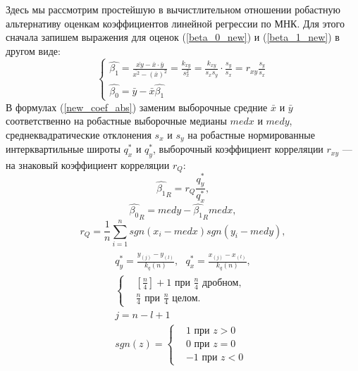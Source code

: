 \documentclass[12pt]{article}
\begin{document}
	Здесь мы рассмотрим простейшую в вычистлительном отношении робастную альтернативу оценкам коэффициентов линейной регрессии по МНК. Для этого сначала запишем выражения для оценок (\ref{beta_0_new}) и (\ref{beta_1_new}) в другом виде:
	\begin{equation}
		\begin{cases}
			\hat{\beta_{1}} = \frac{\bar{xy} - \bar{x} \cdot \bar{y}}{\bar{x^{2}} - (\bar{x})^{2}} = \frac{k_{xy}}{s_{x}^{2}} = \frac{k_{xy}}{s_{x}s_{y}} \cdot \frac{s_{y}}{s_{x}} = r_{xy}\frac{s_{y}}{s_{x}} \\         
			\hat{\beta_{0}} = \bar{y} - \bar{x}\hat{\beta_{1}}
		\end{cases}
		\label{new_coef_abs}
	\end{equation}
	В формулах (\ref{new_coef_abs}) заменим выборочные средние $\bar{x}$ и $\bar{y}$ соответственно на робастные выборочные медианы $med x$ и $med y$, среднеквадратические отклонения $s_{x}$ и $s_{y}$ на робастные нормированные интерквартильные широты $q^{*}_{x}$ и $q^{*}_{y}$, выборочный коэффициент корреляции $r_{xy}$ — на знаковый коэффициент корреляции $r_{Q}$: 
	\begin{equation}
		\hat{\beta_{1}}_{R} = r_{Q}\frac{q^{*}_{y}}{q^{*}_{x}},
		\label{b_1R}
	\end{equation}
	\begin{equation}
		\hat{\beta_{0}}_{R} = med y - \hat{\beta_{1}}_{R} med x,
		\label{b_0R}
	\end{equation}
	\begin{equation}
		r_{Q} = \frac{1}{n}\sum_{i=1}^{n}{sgn(x_{i} - med x)sgn(y_{i} - med y)},
		\label{r_Q}
	\end{equation}
	\begin{multline}
		\\
		q^{*}_{y} = \frac{y_{(j)} -y_{(l)}}{k_{q}(n)},~~~
		q^{*}_{x} = \frac{x_{(j)} - x_{(l)}}{k_{q}(n)}, \\ 
		\begin{cases}
			& [\frac{n}{4}] + 1 \text{ при } \frac{n}{4} \text{ дробном, } \\ 
			& \frac{n}{4} \text{ при } \frac{n}{4} \text{ целом. }
		\end{cases}\\
		j = n - l + 1\\
		sgn(z) = \begin{cases}
			& 1 \text{ при } z > 0 \\ 
			& 0 \text{ при } z = 0 \\
			& -1 \text{ при } z < 0
		\end{cases}\\
		\label{q*}        
	\end{multline}
\end{document}
